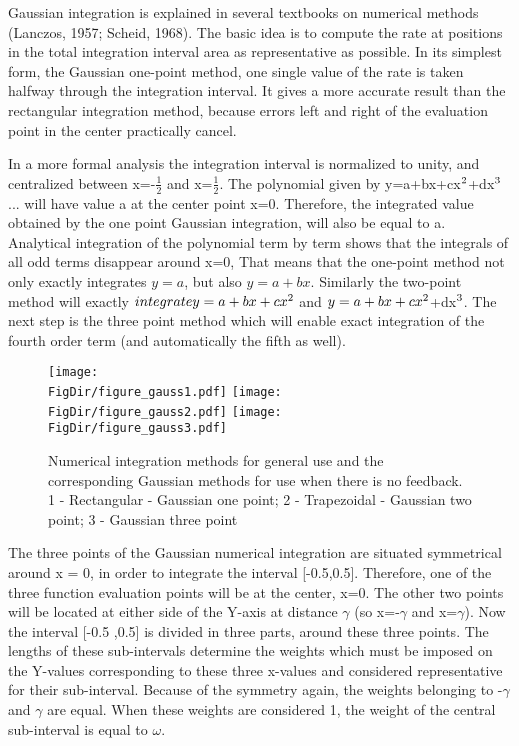 Gaussian integration is explained in several textbooks on numerical methods (Lanczos, 1957;
Scheid, 1968). The basic idea is to compute the rate at positions in the total integration
interval area as representative as possible. In its simplest form, the Gaussian one-point
method, one single value of the rate is taken halfway through the integration interval. It
gives a more accurate result than the rectangular integration method, because errors left and
right of the evaluation point in the center practically cancel.

In a more formal analysis the integration interval is normalized to unity, and centralized
between x=-$\frac{1}{2}$ and x=$\frac{1}{2}$. The polynomial given by 
y=a+bx+cx$^{{\rm 2}}$+dx$^{{\rm 3}}$ ... will have value
a at the center point x=0. Therefore, the integrated value obtained by the one point
Gaussian integration, will also be equal to a. Analytical integration of the polynomial term
by term shows that the integrals of all odd terms disappear around x=0, That means that
the one-point method not only exactly integrates $y=a$, but also $y=a+bx$. Similarly the two-point 
method will exactly $integrate y=a+bx+cx^{{\rm 2}}$ and $y=a+bx+cx^{{\rm 2}}$+dx$^{{\rm 3}}$. 
The next step is the three point method which will enable exact integration of the fourth order 
term (and automatically the fifth as well).
 
\begin{figure}
 \centering
  \texttt{[image: \\FigDir/figure\_gauss1.pdf]}
  \texttt{[image: \\FigDir/figure\_gauss2.pdf]}
  \texttt{[image: \\FigDir/figure\_gauss3.pdf]}
\caption{Numerical integration methods for general use and the corresponding Gaussian
    methods for use when there is no feedback. 1 - Rectangular - Gaussian one point; 
    2 - Trapezoidal - Gaussian two point; 3 - Gaussian three point}
\end{figure}
     
The three points of the Gaussian numerical integration are situated symmetrical around x =
0, in order to integrate the interval [-0.5,0.5]. Therefore, one of the three function
evaluation points will be at the center, x=0. The other two points will be located at either
side of the Y-axis at distance $\gamma$ (so x=-$\gamma$ and x=$\gamma$). Now the interval [-0.5 ,0.5] is divided
in three parts, around these three points. The lengths of these sub-intervals determine the
weights which must be imposed on the Y-values corresponding to these three x-values and
considered representative for their sub-interval. Because of the symmetry again, the weights
belonging to -$\gamma$ and $\gamma$ are equal. When these weights are considered 1, the weight of the
central sub-interval is equal to $\omega$.

